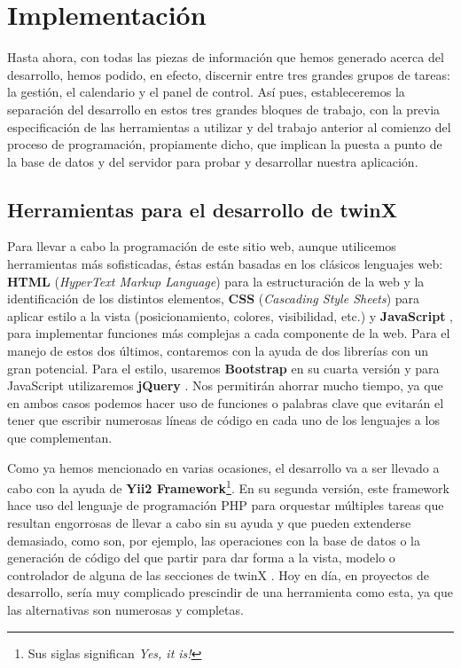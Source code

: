 \chapter{Implementación}
\label{implementacion}

Hasta ahora, con todas las piezas de información que hemos generado acerca del desarrollo, hemos podido, en efecto, discernir entre tres grandes grupos de tareas: la gestión, el calendario y el panel de control. Así pues, estableceremos la separación del desarrollo en estos tres grandes bloques de trabajo, con la previa especificación de las herramientas a utilizar y del trabajo anterior al comienzo del proceso de programación, propiamente dicho, que implican la puesta a punto de la base de datos y del servidor para probar y desarrollar nuestra aplicación.

\section{Herramientas para el desarrollo de twinX}
\label{sec:herramientasdesarrollo}

Para llevar a cabo la programación de este sitio web, aunque utilicemos herramientas más sofisticadas, éstas están basadas en los clásicos lenguajes web: \textbf{HTML} (\textit{HyperText Markup Language}) \cite{html} para la estructuración de la web y la identificación de los distintos elementos, \textbf{CSS} \cite{css} (\textit{Cascading Style Sheets}) para aplicar estilo a la vista (posicionamiento, colores, visibilidad, etc.) y \textbf{JavaScript} \cite{javascript}, para implementar funciones más complejas a cada componente de la web. Para el manejo de estos dos últimos, contaremos con la ayuda de dos librerías con un gran potencial. Para el estilo, usaremos \textbf{Bootstrap} \cite{bootstrap} en su cuarta versión y para JavaScript utilizaremos \textbf{jQuery} \cite{jquery}. Nos permitirán ahorrar mucho tiempo, ya que en ambos casos podemos hacer uso de funciones o palabras clave que evitarán el tener que escribir numerosas líneas de código en cada uno de los lenguajes a los que complementan.

Como ya hemos mencionado en varias ocasiones, el desarrollo va a ser llevado a cabo con la ayuda de \textbf{Yii2 Framework}\footnote{Sus siglas significan \textit{Yes, it is!}}. En su segunda versión, este framework hace uso del lenguaje de programación PHP para orquestar múltiples tareas que resultan engorrosas de llevar a cabo sin su ayuda y que pueden extenderse demasiado, como son, por ejemplo, las operaciones con la base de datos o la generación de código del que partir para dar forma a la vista, modelo o controlador de alguna de las secciones de twinX \cite{yii}. Hoy en día, en proyectos de desarrollo, sería muy complicado prescindir de una herramienta como esta, ya que las alternativas son numerosas y completas.

